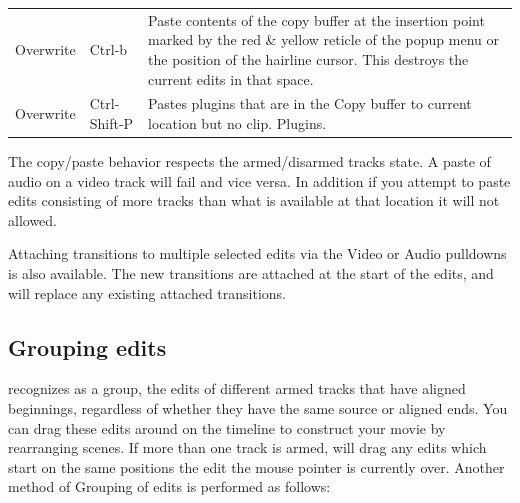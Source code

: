\begin{center}
\begin{longtable}{p{}
    p{} p{}
    }
    Overwrite & Ctrl-b & Paste contents of the copy buffer at the
                         insertion point marked by the red \& yellow
                         reticle of the popup menu or the position
                         of the hairline cursor. This destroys the
                         current edits in that space.\\

    Overwrite & Ctrl-Shift-P & Pastes plugins that are in the Copy
                               buffer to current location but no
                               clip. Plugins.\\
    \bottomrule
  \end{longtable}
\end{center}
\renewcommand{\arraystretch}{1}

The copy/paste behavior respects the armed/disarmed tracks
state.  A paste of audio on a video track will fail and vice versa.
In addition if you attempt to paste edits consisting of more tracks
than what is available at that location it will not allowed.

Attaching transitions to multiple selected edits via the Video or
Audio pulldowns is also available.  The new transitions are attached
at the start of the edits, and will replace any existing attached
transitions.

\subsection{Grouping edits}%
\label{sub:grouping_edits}

\CGG{} recognizes as a group, the edits of different armed tracks
that have aligned beginnings, regardless of whether they have the
same source or aligned ends.  You can drag these edits around on the
timeline to construct your movie by rearranging scenes. If more than
one track is armed, \CGG{} will drag any edits which start on the
same positions the edit the mouse pointer is currently over. Another
method of Grouping of edits is performed as follows:

